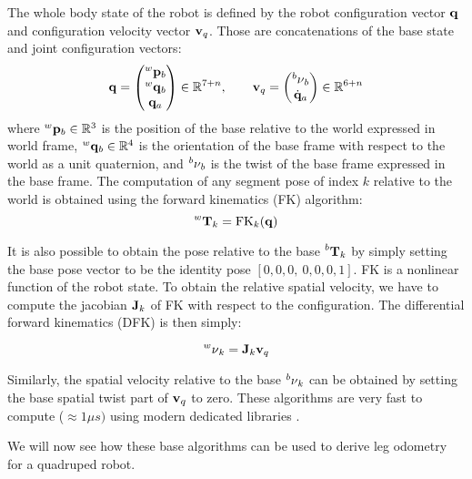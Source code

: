The whole body state of the robot is defined by the robot configuration vector ${\bf q}$ and configuration velocity vector ${\bf v}_q$. Those are concatenations
of the base state and joint configuration vectors:
%
\begin{equation}
    {\bf q}=
    \begin{pmatrix}
        \prescript{w}{}{{\bf p}}_{b} \\
        \prescript{w}{}{{\bf q}}_b \\
        {\bf q}_a
    \end{pmatrix} \in \mathbb{R}^{7+n},
    \quad \quad
    {\bf v}_q=
    \begin{pmatrix}
        \prescript{b}{}{\mathbf{\nu}}_b  \\
        \dot{{\bf q}}_a
    \end{pmatrix}
    \label{eq:configuration} \in \mathbb{R}^{6+n}
\end{equation}
%
where $\prescript{w}{}{{\bf p}}_{b} \in \mathbb{R}^3$ is the position of the base relative to the world expressed in world frame, $\prescript{w}{}{{\bf q}}_b \in \mathbb{R}^4$ is the orientation 
of the base frame with respect to the world as a unit quaternion, and $\prescript{b}{}{\mathbf{\nu}}_b$ is the twist of the base frame expressed in the base frame.
The computation of any segment pose of index $k$ relative to the world is obtained using the forward kinematics (FK) algorithm:
%
\begin{equation}
    \prescript{w}{}{{\bf T}}_{k} = \text{FK}_k({\bf q})
\end{equation}

It is also possible to obtain the pose relative to the base $\prescript{b}{}{{\bf T}}_{k}$ by simply setting the base pose vector to be the identity pose $[0,0,0,~0,0,0,1]$.
FK is a nonlinear function of the robot state. To obtain the relative spatial velocity, we have to compute the jacobian ${\bf J}_k$ of FK with respect to the configuration.
The differential forward kinematics (DFK) is then simply:

\begin{equation}
    \prescript{w}{}{\mathbf{\nu}}_k = {\bf J}_k {\bf v}_q    
\end{equation}

Similarly, the spatial velocity relative to the base $\prescript{b}{}{\mathbf{\nu}}_k$ can be obtained by setting the base spatial twist part of ${\bf v}_q$ to zero.
These algorithms are very fast to compute ($\approx 1\mu s)$ using modern dedicated libraries \cite{carpentier2019pinocchio}.

We will now see how these base algorithms can be used to derive leg odometry for a quadruped robot.

